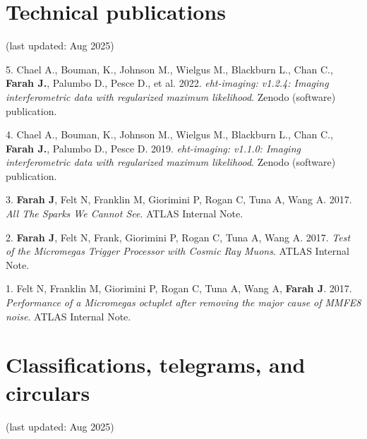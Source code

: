 \documentclass[margin,line]{res}
\begin{document}
\begin{resume}





\vspace{+.4cm}
\section{\sc Technical publications}
(last updated: Aug 2025)

5. Chael A., Bouman, K., Johnson  M., Wielgus M., Blackburn L., Chan C., \textbf{Farah J.}, Palumbo D., Pesce D., et al. 2022. \textit{eht-imaging: v1.2.4: Imaging interferometric data with regularized maximum likelihood}. Zenodo (software) publication.

4. Chael A., Bouman, K., Johnson  M., Wielgus M., Blackburn L., Chan C., \textbf{Farah J.}, Palumbo D., Pesce D. 2019. \textit{eht-imaging: v1.1.0: Imaging interferometric data with regularized maximum likelihood}. Zenodo (software) publication.

3. \textbf{Farah J}, Felt N, Franklin M, Giorimini P, Rogan C, Tuna A, Wang A. 2017. \textit{All The Sparks We Cannot See}. ATLAS Internal Note.

2. \textbf{Farah J}, Felt N, Frank, Giorimini P, Rogan C, Tuna A, Wang A. 2017. \textit{Test of the Micromegas Trigger Processor with Cosmic Ray Muons}. ATLAS Internal Note.

1. Felt N, Franklin M, Giorimini P, Rogan C, Tuna A, Wang A, \textbf{Farah J}. 2017. \textit{Performance of a Micromegas octuplet after removing the major cause of MMFE8 noise}. ATLAS Internal Note.

\vspace{+.4cm}
\section{\sc Classifications, telegrams, and circulars}
(last updated: Aug 2025)


\end{resume}
\end{document}
